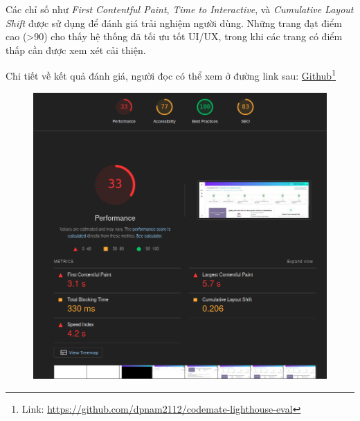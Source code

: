 Các chỉ số như \textit{First Contentful Paint}, \textit{Time to Interactive}, và \textit{Cumulative Layout Shift} được sử dụng để đánh giá trải nghiệm người dùng. Những trang đạt điểm cao (>90) cho thấy hệ thống đã tối ưu tốt UI/UX, trong khi các trang có điểm thấp cần được xem xét cải thiện.

Chi tiết về kết quả đánh giá, người đọc có thể xem ở đường link sau: \href{https://github.com/dpnam2112/codemate-lighthouse-eval}{Github}\footnote{Link: \url{https://github.com/dpnam2112/codemate-lighthouse-eval}}

\begin{figure}[H]
\centering
\begin{minipage}{0.45\textwidth}
  \centering
  \includegraphics[width=\linewidth]{images/lighthouse_lp_page_eval.png}
\end{minipage}
\hfill
\begin{minipage}{0.45\textwidth}
  \centering

\end{minipage}
\end{figure}
